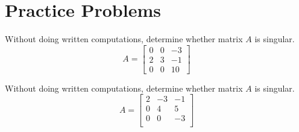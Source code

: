 \documentclass{ximera}
\begin{document}






\section*{Practice Problems}

  \begin{problem}\label{prob:singmatrixdet1a}
  Without doing written computations, determine whether matrix $A$ is singular. 
  $$A=\begin{bmatrix}0&0&-3\\2&3&-1\\0&0&10\end{bmatrix}$$
  \begin{multipleChoice}
  \end{multipleChoice}
  \end{problem}

\begin{problem}\label{prob:singmatrixdet1b}
 Without doing written computations, determine whether matrix $A$ is singular. 
  $$A=\begin{bmatrix}2&-3&-1\\0&4&5\\0&0&-3\\\end{bmatrix}$$
  \begin{multipleChoice}
  \end{multipleChoice}
  \end{problem}
\end{document}

